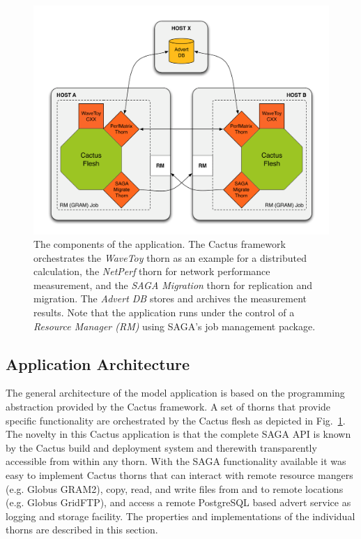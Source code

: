 \documentclass[conference,final]{IEEEtran}
\newcommand{\jhanote}[1]{ {\textcolor{red} { ***Jha: #1 }}}
\begin{document}
\begin{figure}
 \begin{center}
 \includegraphics[scale=0.30]{./figures/figure_02}
\end{center}
\caption{The components of the application. The Cactus framework orchestrates the \textit{WaveToy} thorn as an example for a distributed calculation, the \textit{NetPerf} thorn for network performance measurement, and the \textit{SAGA Migration} thorn for replication and migration. The \textit{Advert DB}
stores and archives the measurement results. Note that the application runs under the control of a \textit{Resource Manager (RM)} using SAGA's job management package.}
 \label{fig:arch}
 \end{figure}



\subsection { Application Architecture} 
The general architecture of the model application is based on the
programming abstraction provided by the Cactus framework. A set of
thorns that provide specific functionality are orchestrated by the
Cactus flesh as depicted in Fig.~\ref{fig:arch}. The novelty in this
Cactus application is that the complete SAGA API is known by the
Cactus build and deployment system and therewith transparently
accessible from within any thorn. With the SAGA functionality
available it was easy to implement Cactus thorns that can interact
with remote resource mangers (e.g. Globus GRAM2), copy, read, and
write files from and to remote locations (e.g. Globus GridFTP), and
access a remote PostgreSQL based advert service as logging and storage
facility. The properties and implementations of the individual thorns
are described in this section.
\end{document}
